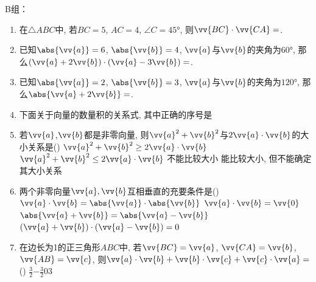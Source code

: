 B组：
\begin{enumerate}
    \item 在$\triangle{ABC}$中, 若$BC=5$, $AC=4$, $\angle{C}=\ang{45}$, 则$\vv{BC}\cdot\vv{CA}=$. 
    \item 已知$\abs{\vv{a}}=6$, $\abs{\vv{b}}=4$, $\vv{a}$与$\vv{b}$的夹角为$\ang{60}$, 那么$(\vv{a}+2\vv{b})\cdot(\vv{a}-3\vv{b})=$.
    \item 已知$\abs{\vv{a}}=2$, $\abs{\vv{b}}=3$, $\vv{a}$与$\vv{b}$的夹角为$\ang{120}$, 那么$\abs{\vv{a}+2\vv{b}}=$. 
    \item 下面关于向量的数量积的关系式, 其中正确的序号是
    
    
    \item 若$\vv{a}$,$\vv{b}$都是非零向量, 则$\vv{a}^{2}+\vv{b}^{2}$与$2\vv{a}\cdot\vv{b}$的大小关系是\dotfill()
    \xx
    {$\vv{a}^{2}+\vv{b}^{2}\geq2\vv{a}\cdot\vv{b}$}
    {$\vv{a}^{2}+\vv{b}^{2}\leq2\vv{a}\cdot\vv{b}$}
    {不能比较大小}
    {能比较大小, 但不能确定其大小关系}
    
    \item 两个非零向量$\vv{a},\vv{b}$互相垂直的充要条件是\dotfill()
    \xx
    {$\vv{a}\cdot\vv{b}=\abs{\vv{a}}\cdot\abs{\vv{b}}$}
    {$\vv{a}\cdot\vv{b}=\vv{0}$}
    {$\abs{\vv{a}+\vv{b}}=\abs{\vv{a}-\vv{b}}$}
    {$(\vv{a}+\vv{b})\cdot(\vv{a}-\vv{b})=0$}
    \item 在边长为1的正三角形$ABC$中, 若$\vv{BC}=\vv{a}$, $\vv{CA}=\vv{b}$, $\vv{AB}=\vv{c}$, 则$\vv{a}\cdot\vv{b}+\vv{b}\cdot\vv{c}+\vv{c}\cdot\vv{a}=$\dotfill()
    \xx
    {$\frac{3}{2}$}{$-\frac{3}{2}$}{0}{3}


\end{enumerate}

